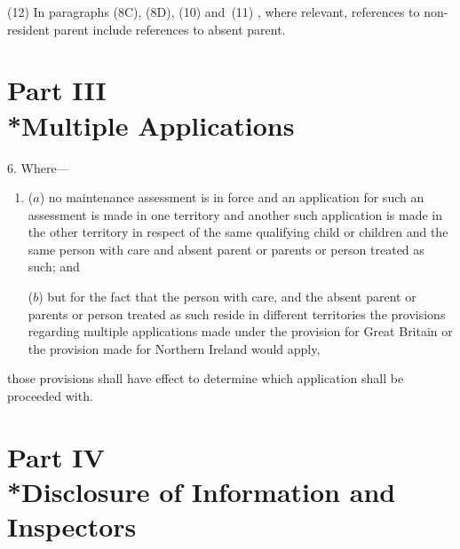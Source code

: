 \documentclass[12pt,a4paper]{article}
\begin{document}
(12) In paragraphs 
(8C), (8D), (10) and~(11)%
, where relevant, references to non-resident parent include references to absent parent.


\section[Part III --- Multiple Applications]{Part III\\*Multiple Applications}

\renewcommand\parthead{--- Schedule 1 Part III}

6.  Where—
\begin{enumerate}\item[]
($a$) no maintenance assessment is in force and an application for such an assessment is made in one territory and another such application is made in the other territory in respect of the same qualifying child or children and the same person with care and absent parent or parents or person treated as such; and

($b$) but for the fact that the person with care, and the absent parent or parents or person treated as such reside in different territories the provisions regarding multiple applications made under the provision for Great Britain or the provision made for Northern Ireland would apply,
\end{enumerate}
those provisions shall have effect to determine which application shall be proceeded with.

\section[Part IV --- Disclosure of Information and Inspectors]{Part IV\\*Disclosure of Information and Inspectors}

\renewcommand\parthead{--- Schedule 1 Part IV}
\end{document}
